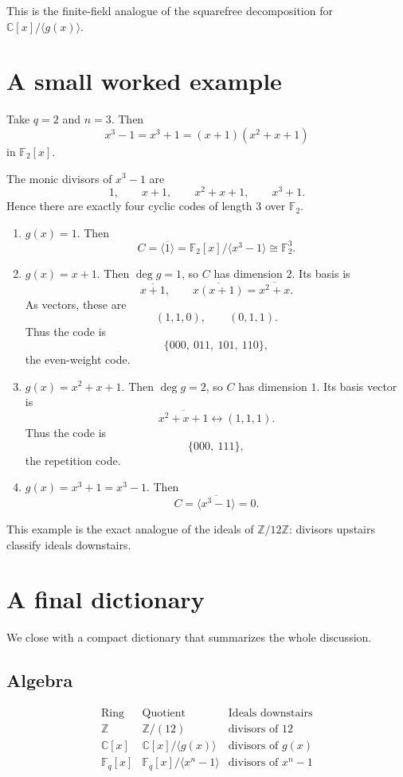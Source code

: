 \documentclass[11pt]{article}
\theoremstyle{definition}
\newcommand{\Z}{\mathbb{Z}}
\newcommand{\C}{\mathbb{C}}
\newcommand{\F}{\mathbb{F}}
\newcommand{\ideal}[1]{\langle #1\rangle}
\newcommand{\ol}[1]{\overline{#1}}
\begin{document}
	This is the finite-field analogue of the squarefree decomposition for $\C[x]/\ideal{g(x)}$.
	
	\section{A small worked example}
	
	Take $q=2$ and $n=3$. Then
	\[
	x^3-1=x^3+1=(x+1)(x^2+x+1)
	\]
	in $\F_2[x]$.
	
	The monic divisors of $x^3-1$ are
	\[
	1,\qquad x+1,\qquad x^2+x+1,\qquad x^3+1.
	\]
	Hence there are exactly four cyclic codes of length $3$ over $\F_2$.
	
	\begin{enumerate}[label=\textbf{(\arabic*)}]
		\item $g(x)=1$. Then
		\[
		C=\ideal{\ol{1}}=\F_2[x]/\ideal{x^3-1}\cong \F_2^3.
		\]
		
		\item $g(x)=x+1$. Then $\deg g=1$, so $C$ has dimension $2$. Its basis is
		\[
		\ol{x+1},\qquad \ol{x(x+1)}=\ol{x^2+x}.
		\]
		As vectors, these are
		\[
		(1,1,0),\qquad (0,1,1).
		\]
		Thus the code is
		\[
		\{000,\ 011,\ 101,\ 110\},
		\]
		the even-weight code.
		
		\item $g(x)=x^2+x+1$. Then $\deg g=2$, so $C$ has dimension $1$. Its basis vector is
		\[
		\ol{x^2+x+1}\leftrightarrow (1,1,1).
		\]
		Thus the code is
		\[
		\{000,\ 111\},
		\]
		the repetition code.
		
		\item $g(x)=x^3+1=x^3-1$. Then
		\[
		C=\ideal{\ol{x^3-1}}=0.
		\]
	\end{enumerate}
	
	This example is the exact analogue of the ideals of $\Z/12\Z$: divisors upstairs classify ideals downstairs.
	
	\section{A final dictionary}
	
	We close with a compact dictionary that summarizes the whole discussion.
	
	\subsection*{Algebra}
	
	\[
	\begin{array}{c|c|c}
		\text{Ring} & \text{Quotient} & \text{Ideals downstairs} \\
		\hline
		\Z & \Z/(12) & \text{divisors of }12 \\
		\C[x] & \C[x]/\ideal{g(x)} & \text{divisors of }g(x) \\
		\F_q[x] & \F_q[x]/\ideal{x^n-1} & \text{divisors of }x^n-1
	\end{array}
	\]
	
\end{document}
